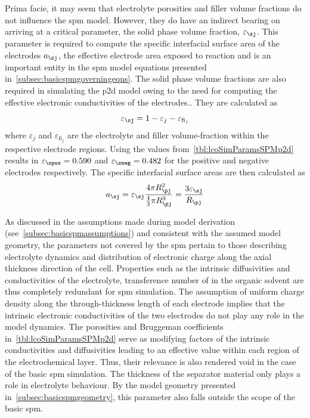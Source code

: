 Prima facie, it may seem that electrolyte porosities and filler volume fractions
do  not  influence the  \gls{spm}  model.  However,  they  do have  an  indirect
bearing  on arriving  at a  critical parameter,  \viz{} the  solid phase  volume
fraction, $\varepsilon_\sj$. This parameter is  required to compute the specific
interfacial  surface  area  of  the  electrodes  $a_\sj$,  \ie{}  the  effective
electrode area exposed  to reaction and is an important  entity in the \gls{spm}
model  equations  presented  in~\cref{subsec:basicspmgoverningeqns}.  The  solid
phase volume fractions are also required in simulating the \gls{p2d} model owing
to  the  need for  computing  the  effective  electronic conductivities  of  the
electrodes..  They are
calculated as
\begin{equation}
\varepsilon_\sj = 1 - \varepsilon_j - \varepsilon_{\text{fi}_j}
\end{equation}
where $\varepsilon_j$  and $\varepsilon_{\text{fi}_j}$  are the  electrolyte and
filler  volume-fraction  within  the  respective electrode  regions.  Using  the
values from~\cref{tbl:lcoSimParamsSPMp2d} results in $\varepsilon_\spos = 0.590$
and  $\varepsilon_\sneg  =  0.482$  for the  positive  and  negative  electrodes
respectively. The specific interfacial surface areas are then calculated as
\begin{equation}
    a_\sj = \varepsilon_\sj \frac{4 \pi R_\pj^2}{\frac{4}{3} \pi R_\pj^3} = \frac{3\varepsilon_\sj}{R_\pj}
\end{equation}

As    discussed   in    the   assumptions    made   during    model   derivation
(see~\cref{subsec:basicspmassumptions})  and consistent  with the  assumed model
geometry,  the  parameters  not  covered  by  the  \gls{spm}  pertain  to  those
describing electrolyte dynamics and distribution  of electronic charge along the
axial  thickness  direction  of  the  cell. Properties  such  as  the  intrinsic
diffusivities  and conductivities  of  the electrolyte,  transference number  of
 in  the organic  solvent are thus  completely redundant  for \gls{spm}
simulation. The assumption of uniform charge density along the through-thickness
length of each electrode implies that the intrinsic electronic conductivities of
the two electrodes  do not play any  role in the model  dynamics. The porosities
and Bruggeman  coefficients in~\cref{tbl:lcoSimParamsSPMp2d} serve  as modifying
factors  of  the  intrinsic  conductivities  and  diffusivities  leading  to  an
effective value  within each  region of the  electrochemical layer.  Thus, their
relevance is also  rendered void in the case of  the basic \gls{spm} simulation.
The  thickness of  the  separator  material only  plays  a  role in  electrolyte
behaviour.  By the  model geometry  presented in~\cref{subsec:basicspmgeometry},
this parameter also falls outside the scope of the basic \gls{spm}.

